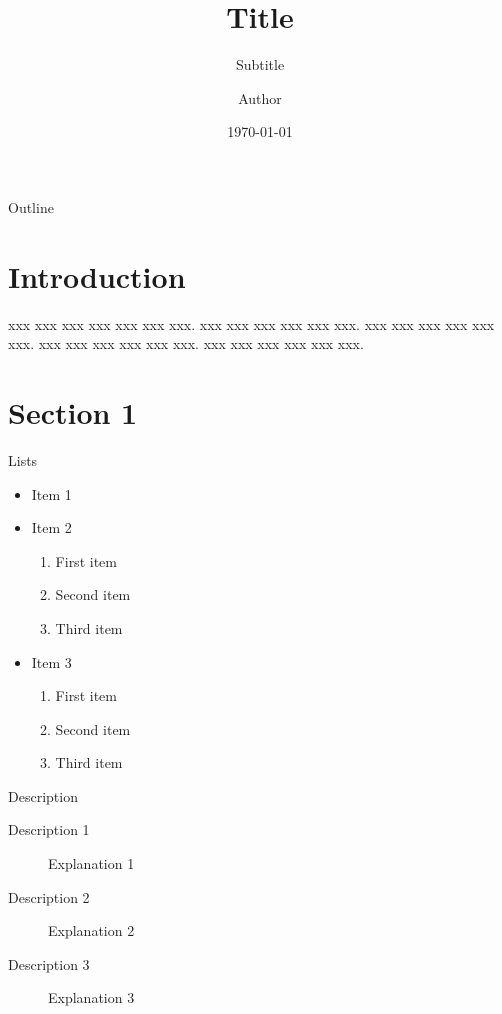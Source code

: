 \documentclass[compress,aspectratio=43]{beamer}
\title{Title}
\subtitle{Subtitle}
\author{Author}
\date{\today}
\institute[XXXX]{University of XXXX}
\begin{document}
\begin{frame}[plain]
    \titlepage
\end{frame}

\begin{frame}{Outline}
    \tableofcontents[sectionstyle=show,subsectionstyle=show/shaded/hide,
        subsubsectionstyle=show/shaded/hide]
\end{frame}

\section{Introduction}

\begin{frame}
    xxx xxx xxx xxx xxx xxx xxx.
    xxx xxx xxx xxx xxx xxx.
    xxx xxx xxx xxx xxx xxx.
    xxx xxx xxx xxx xxx xxx.
    xxx xxx xxx xxx xxx xxx.
\end{frame}

\section{Section 1}

\begin{frame}{Lists}
    \begin{itemize}
        \item Item 1
        \item Item 2
              \begin{enumerate}
                  \item First item
                  \item Second item
                  \item Third item
              \end{enumerate}
        \item Item 3
              \begin{enumerate}
                  \item First item
                  \item Second item
                  \item Third item
              \end{enumerate}
    \end{itemize}
\end{frame}

\begin{frame}{Description}
    \begin{description}
        \item[Description 1] Explanation 1
        \item[Description 2] Explanation 2
        \item[Description 3] Explanation 3
    \end{description}
\end{frame}
\end{document}
